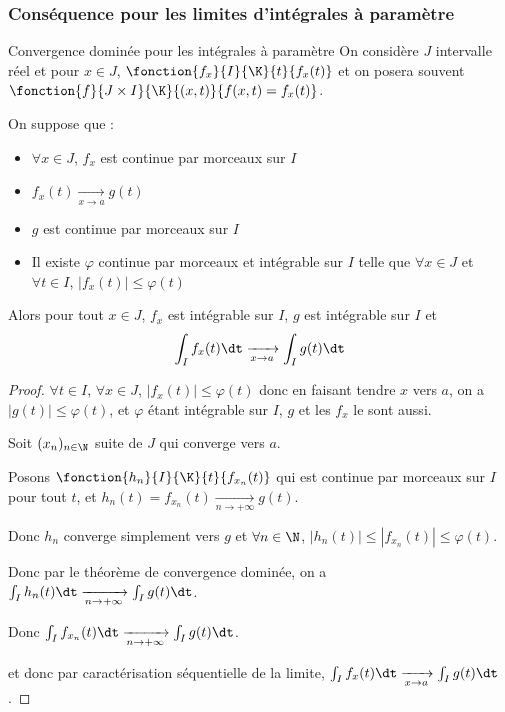 \subsubsection{Conséquence pour les limites d'intégrales à paramètre}

\begin{proposition}{Convergence dominée pour les intégrales à paramètre}{}
    On considère $J$ intervalle réel et pour $x \in J$, $\fonction {f_x}{I}{\K}{t}{f_x(t)}$
    et on posera souvent $\fonction {f} {J \times I}{\K}{(x, t)}{f(x, t) = f_x(t)}$.

    On suppose que : 
    \begin{itemize}
        \item $\forall x \in J$, $f_x$ est continue par morceaux sur $I$
        \item $f_x(t) \xrightarrow[x \to a]{} g(t)$
        \item $g$ est continue par morceaux sur $I$
        \item Il existe $\varphi$ continue par morceaux et intégrable sur $I$ telle que 
        $\forall x \in J$ et $\forall t \in I$, $|f_x(t)| \leqslant \varphi(t)$
    \end{itemize}

    Alors pour tout $x \in J$, $f_x$ est intégrable sur $I$, $g$ est intégrable sur $I$ et 
    $$\int_I f_x(t) \dt \xrightarrow[x \to a]{} \int_I g(t) \dt$$
\end{proposition}


\begin{proof}
    $\forall t \in I$, $\forall x \in J$, $|f_x(t)| \leqslant \varphi(t)$ donc en faisant tendre 
    $x$ vers $a$, on a $|g(t)| \leqslant \varphi(t)$, et $\varphi$ étant intégrable sur 
    $I$, $g$ et les $f_x$ le sont aussi. 

    Soit $(x_n)_{n \in \N}$ suite de $J$ qui converge vers $a$. 

    Posons $\fonction {h_n}{I}{\K}{t}{f_{x_n}(t)}$ qui est continue par morceaux sur $I$ pour 
    tout $t$, et $h_n(t) = f_{x_n}(t) \xrightarrow[n \to + \infty]{} g(t)$.

    Donc $h_n$ converge simplement vers $g$ et $\forall n \in \N$, $|h_n(t)| \leqslant |f_{x_n}(t)| \leqslant \varphi(t)$.

    Donc par le théorème de convergence dominée, on a $\int_I h_n(t) \dt \xrightarrow[n \to + \infty]{} \int_I g(t) \dt$.

    Donc $\int_I f_{x_n}(t) \dt \xrightarrow[n \to + \infty]{} \int_I g(t) \dt$.

    et donc par caractérisation séquentielle de la limite, $\int_I f_x(t) \dt \xrightarrow[x \to a]{} \int_I g(t) \dt$.
\end{proof}

